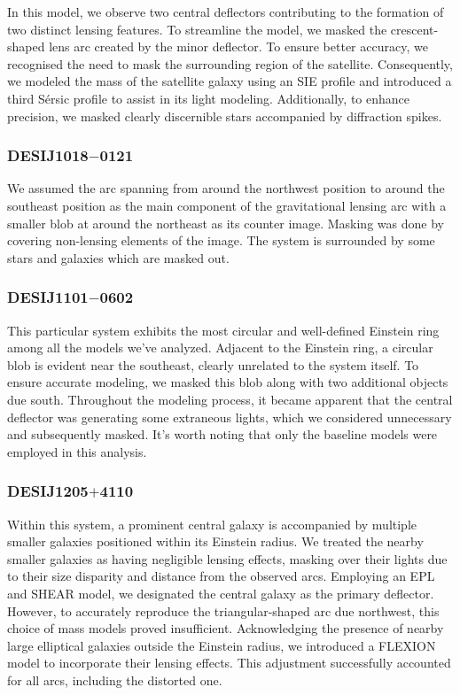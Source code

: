 \documentclass{aa}
\begin{document}
In this model, we observe two central deflectors contributing to the formation of two distinct lensing features. To streamline the model, we masked the crescent-shaped lens arc created by the minor deflector. To ensure better accuracy, we recognised the need to mask the surrounding region of the satellite. Consequently, we modeled the mass of the satellite galaxy using an SIE profile and introduced a third S\'ersic profile to assist in its light modeling. Additionally, to enhance precision, we masked clearly discernible stars accompanied by diffraction spikes.

\subsubsection{DESIJ1018$-$0121}

We assumed the arc spanning from around the northwest position to around the southeast position as the main component of the gravitational lensing arc with a smaller blob at around the northeast as its counter image. Masking was done by covering non-lensing elements of the image. The system is surrounded by some stars and galaxies which are masked out.


\subsubsection{DESIJ1101$-$0602}

This particular system exhibits the most circular and well-defined Einstein ring among all the models we've analyzed. Adjacent to the Einstein ring, a circular blob is evident near the southeast, clearly unrelated to the system itself. To ensure accurate modeling, we masked this blob along with two additional objects due south. Throughout the modeling process, it became apparent that the central deflector was generating some extraneous lights, which we considered unnecessary and subsequently masked. It's worth noting that only the baseline models were employed in this analysis.

\subsubsection{DESIJ1205$+$4110}
\newcommand{\suggestion}[1]{\textcolor{blue}{#1}}

Within this system, a prominent central galaxy is accompanied by multiple smaller galaxies positioned within its Einstein radius. We treated the nearby smaller galaxies as having negligible lensing effects, masking over their lights due to their size disparity and distance from the observed arcs. Employing an EPL and SHEAR model, we designated the central galaxy as the primary deflector. However, to accurately reproduce the triangular-shaped arc due northwest, this choice of mass models proved insufficient. Acknowledging the presence of nearby large elliptical galaxies outside the Einstein radius, we introduced a FLEXION model to incorporate their lensing effects. This adjustment successfully accounted for all arcs, including the distorted one.
\end{document}
